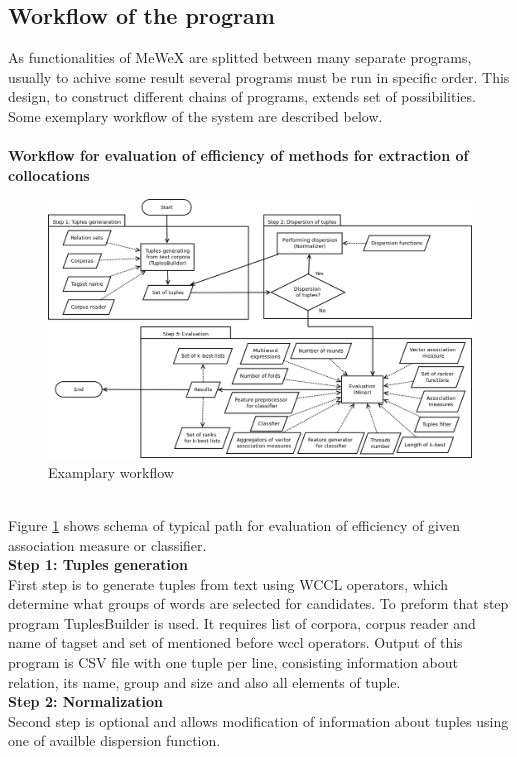 \subsection{Workflow of the program} \label{mewex_workflow}
As functionalities of MeWeX are splitted between many separate programs, usually to achive some result several programs must be run in specific order. 
This design, to construct different chains of programs, extends set of possibilities. Some exemplary workflow of the system are described below. 
\\ \\\textbf{Workflow for evaluation of efficiency of methods for extraction of collocations}
\begin{figure}[ht]
	\centering
	\includegraphics[scale=0.4]{img/mewex_workflow1.png}
	\caption{Examplary workflow}
	\label{img_workflow1}
\end{figure}
\\ Figure \ref{img_workflow1} shows schema of typical path for evaluation of efficiency of given association measure or classifier.
\\ \textbf{Step 1: Tuples generation}\\
First step is to generate tuples from text using WCCL operators, which determine what groups of words are selected for candidates. 
To preform that step program TuplesBuilder is used. It requires list of corpora, corpus reader and name of tagset and 
set of mentioned before wccl operators. Output of this program is CSV file with one tuple per line, consisting information about relation, 
its name, group and size and also all elements of tuple.
\\ \textbf{Step 2: Normalization}\\
Second step is optional and allows modification of information about tuples using one of availble dispersion function. 
